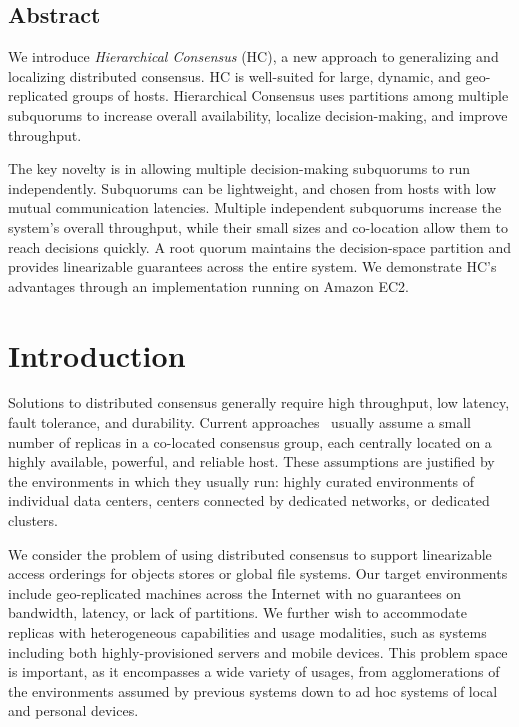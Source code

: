 \documentclass[letterpaper,10pt,twocolumn]{article}
\newcommand{\subs}{subquorums\xspace}
\newcommand{\Subs}{Subquorums\xspace}
\newcommand{\roo}{root quorum\xspace}
\begin{document}
\subsection*{Abstract}

We introduce \emph{Hierarchical Consensus} (HC), a new approach to generalizing and
localizing distributed consensus.
HC is well-suited for large, dynamic, and geo-replicated groups of hosts.
Hierarchical Consensus uses partitions among multiple \subs to increase
overall availability, localize decision-making, and improve throughput.

The key novelty is in allowing multiple decision-making \subs to run
independently.
\Subs can be lightweight, and chosen from hosts with low mutual communication
latencies.
Multiple independent \subs increase the system's overall throughput, while
their small sizes and co-location allow them to reach decisions quickly.
A \roo maintains the decision-space partition and provides linearizable
guarantees across the entire system.
We demonstrate HC's advantages through an implementation running on Amazon
EC2.

\section{Introduction}
Solutions to distributed consensus generally require high throughput, low latency, fault
tolerance, and durability.
Current
approaches~\cite{biely_s-paxos:_2012,mao_mencius:_2008,moraru_there_2013,kraska_mdcc:_2013,shapiroConsensus}
usually assume a small number of replicas in a co-located consensus group, each centrally
located on a highly available, powerful, and reliable host.
These assumptions are justified by the environments in which they usually run: highly
curated environments of individual data centers, centers connected by dedicated
networks, or dedicated clusters.

We consider the problem of using distributed consensus to support linearizable access
orderings for objects stores or global file systems.
Our target environments include geo-replicated machines across the Internet with no guarantees on
bandwidth, latency, or lack of partitions.
We further wish to accommodate replicas with heterogeneous capabilities and
usage modalities, such as systems including both highly-provisioned servers and
mobile devices.
This problem space is important, as it encompasses a wide variety of usages, from
agglomerations of the environments assumed by previous systems down to ad hoc
systems of local and personal devices.
\end{document}
